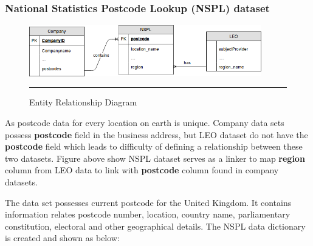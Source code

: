 \subsubsection{National Statistics Postcode Lookup (NSPL) dataset}

\begin{figure}[H]
	\centering
	\includegraphics[width=0.9\textwidth]{Figure/erd-data.png}
	\rule{35em}{0.5pt}
	\caption[Entity Relationship Diagram]{Entity Relationship Diagram}
\end{figure}

As postcode data for every location on earth is unique. Company data sets possess \textbf{postcode} field in the business address, but LEO dataset do not have the \textbf{postcode} field which leads to difficulty of defining a relationship between these two datasets. Figure above show NSPL dataset serves as a linker to map \textbf{region} column from LEO data to link with \textbf{postcode} column found in company datasets.

The data set possesses current postcode for the United Kingdom. It contains information relates postcode number, location, country name, parliamentary constitution, electoral and other geographical details. The NSPL data dictionary is created and shown as below:

